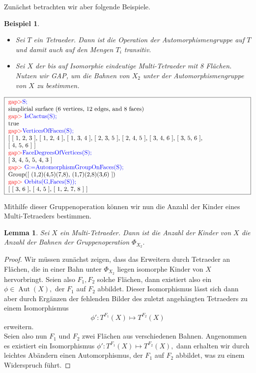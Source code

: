 \documentclass[12pt,titlepage,twoside,cleardoublepage]{article}
\theoremstyle{nummermitklammern}
\newtheorem{lemma}[temp]{Lemma}
\newtheorem{bsp}[temp]{Beispiel}
\newtheorem{lemma}[zahl]{Lemma}
\newtheorem{bsp}[zahl]{Beispiel}
\numberwithin{equation}{section}
\DeclareMathOperator{\Aut}{Aut}
\begin{document}
Zunächst betrachten wir aber folgende Beispiele. 
\begin{bsp}
\begin{itemize}
\item Sei $T$ ein Tetraeder. Dann ist die Operation der Automorphismengruppe auf $T$ und damit auch auf den Mengen $T_i$ transitiv.
\item Sei $X$ der bis auf Isomorphie eindeutige Multi-Tetraeder mit 8 Flächen. Nutzen wir GAP, um die Bahnen von $X_2$ unter der Automorphismengruppe von $X$ zu bestimmen.
\end{itemize}
\end{bsp}
\begin{center}
$\fbox{
\parbox{14cm} {
\textcolor{red}{gap$>$}\textcolor{blue}{ S;}\newline
simplicial surface (6 vertices, 12 edges, and 8 faces)\newline
\textcolor{red}{gap$>$} \textcolor{blue}{ IsCactus(S);}\newline
true\newline
\textcolor{red}{gap$>$}\textcolor{blue}{  VerticesOfFaces(S);}\newline
[ [ 1, 2, 3 ], [ 1, 2, 4 ], [ 1, 3, 4 ], [ 2, 3, 5 ], [ 2, 4, 5 ], [ 3, 4, 6 ], [ 3, 5, 6 ],\newline
  [ 4, 5, 6 ] ]\newline
\textcolor{red}{gap$>$}\textcolor{blue}{  FaceDegreesOfVertices(S);}\newline
[ 3, 4, 5, 5, 4, 3 ]\newline
\textcolor{red}{gap$>$} \textcolor{blue}{ G:=AutomorphismGroupOnFaces(S);}\newline
Group([ (1,2)(4,5)(7,8), (1,7)(2,8)(3,6) ])\newline
\textcolor{red}{gap$>$} \textcolor{blue}{ Orbits(G,Faces(S));}\newline
[ [ 3, 6 ], [ 4, 5 ], [ 1, 2, 7, 8 ] ]
}}$
\end{center}
Mithilfe dieser Gruppenoperation können wir nun die Anzahl der Kinder eines Multi-Tetraeders bestimmen.
\begin{lemma}\label{bahn}
Sei $X$ ein Multi-Tetraeder. Dann ist die Anzahl der Kinder von $X$ die Anzahl der Bahnen der Gruppenoperation $\Phi_{X_2}.$
\end{lemma}
\begin{proof}
Wir müssen zunächst zeigen, dass das Erweitern durch Tetraeder an Flächen, die in einer Bahn unter $\Phi_{X_2}$ liegen isomorphe Kinder von $X$ hervorbringt. Seien also $F_1,F_2$ solche Flächen, dann existiert also ein $\phi \in \Aut(X),$ der $F_1$ auf $F_2$ abbildet. Dieser Isomorphismus lässt sich dann aber durch Ergänzen der fehlenden Bilder des zuletzt angehängten Tetraeders zu einem Isomorphismus 
\[
\phi':T^{F_1}(X)\mapsto T^{F_2}(X)
\]
 erweitern. \\
 Seien also nun $F_1$ und $F_2$ zwei Flächen aus verschiedenen Bahnen. Angenommen es existiert ein Isomorphismus $\phi':T^{F_1}(X)\mapsto T^{F_2}(X),$ dann erhalten wir durch leichtes Abändern einen Automorphismus, der $F_1$ auf $F_2$ abbildet, was zu einem Widerspruch führt. 
\end{proof}
\end{document}
